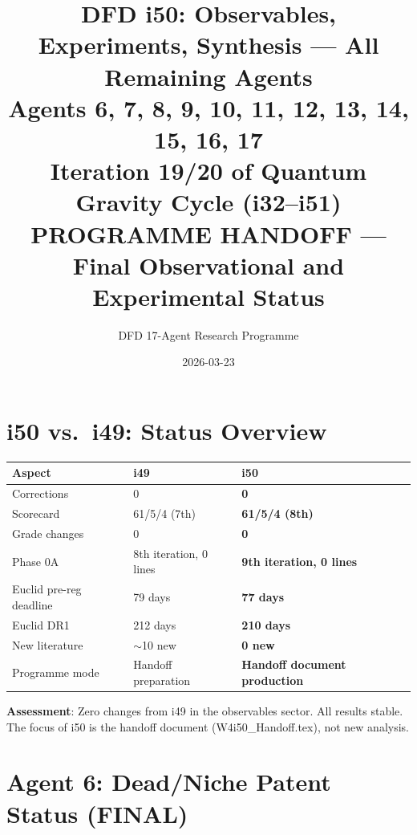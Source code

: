 \documentclass[11pt,a4paper]{article}
\title{DFD i50: Observables, Experiments, Synthesis --- All Remaining Agents\\[6pt]
\large Agents 6, 7, 8, 9, 10, 11, 12, 13, 14, 15, 16, 17\\[6pt]
\normalsize Iteration 19/20 of Quantum Gravity Cycle (i32--i51)\\[6pt]
\textbf{PROGRAMME HANDOFF --- Final Observational and Experimental Status}}
\author{DFD 17-Agent Research Programme}
\date{2026-03-23}
\begin{document}
\maketitle
\tableofcontents
\newpage

\part{i50 vs.\ i49: Status Overview}

\begin{center}
\begin{tabular}{lll}
\toprule
\textbf{Aspect} & \textbf{i49} & \textbf{i50} \\
\midrule
Corrections & 0 & \textbf{0} \\
Scorecard & 61/5/4 (7th) & \textbf{61/5/4 (8th)} \\
Grade changes & 0 & \textbf{0} \\
Phase 0A & 8th iteration, 0 lines & \textbf{9th iteration, 0 lines} \\
Euclid pre-reg deadline & 79 days & \textbf{77 days} \\
Euclid DR1 & 212 days & \textbf{210 days} \\
New literature & $\sim$10 new & \textbf{0 new} \\
Programme mode & Handoff preparation & \textbf{Handoff document production} \\
\bottomrule
\end{tabular}
\end{center}

\textbf{Assessment}: Zero changes from i49 in the observables sector. All results stable. The focus of i50 is the handoff document (W4i50\_Handoff.tex), not new analysis.


\part{Agent 6: Dead/Niche Patent Status (FINAL)}
\label{part:agent6}
\end{document}

